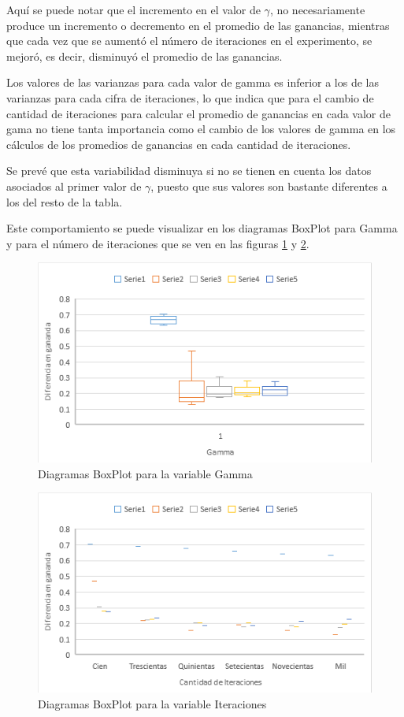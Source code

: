 Aquí se puede notar que el incremento en el valor de $\gamma$, no necesariamente produce un incremento o decremento en el promedio de las ganancias, mientras que cada vez que se aumentó el número de iteraciones en el experimento, se mejoró, es decir, disminuyó el promedio de las ganancias.

Los valores de las varianzas para cada valor de gamma es inferior a los de las varianzas para cada cifra de iteraciones, lo que indica que para el cambio de cantidad de iteraciones para calcular el promedio de ganancias en cada valor de gama no tiene tanta importancia como el cambio de los valores de gamma en los cálculos de los promedios de ganancias en cada cantidad de iteraciones.

Se prevé que esta variabilidad disminuya si no se tienen en cuenta los datos asociados al primer valor de $\gamma$, puesto que sus valores son bastante diferentes a los del resto de la tabla.

Este comportamiento se puede visualizar en los diagramas BoxPlot para Gamma y para el número de iteraciones que se ven en las figuras \ref{Cajas1} y \ref{Cajas1_1}.

\begin{figure} [H]
	\centering
	\includegraphics[scale=1]{Cajas1.png}
	\caption{Diagramas BoxPlot para la variable Gamma}
	\label{Cajas1}
\end{figure}

\begin{figure} [H]
	\centering
	\includegraphics[scale=1]{Cajas1_1.png}
	\caption{Diagramas BoxPlot para la variable Iteraciones}
	\label{Cajas1_1}
\end{figure}

